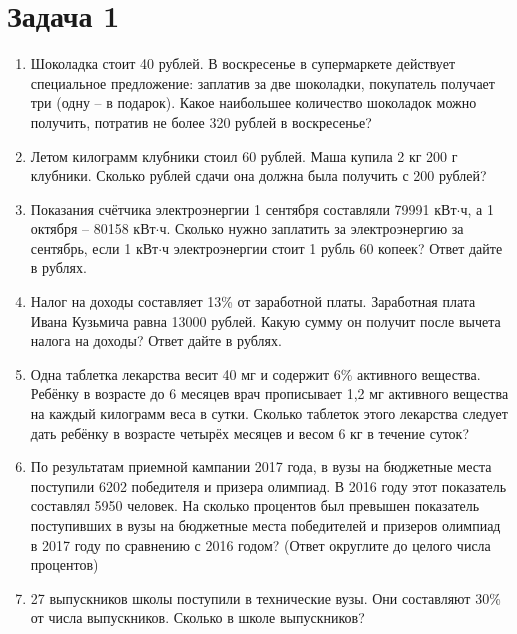 \chapter{Задача 1}	
	\begin{enumerate}
	
	\item  Шоколадка стоит 40 рублей. В воскресенье в супермаркете действует  
	специальное    предложение:  заплатив  за  две  шоколадки, покупатель  получает  три 
	(одну  –  в  подарок). Какое наибольшее  количество  шоколадок  можно  получить, 
	потратив не более 320 рублей в воскресенье? 
	
	\item Летом  килограмм  клубники  стоил  60  рублей. Маша  купила  2  кг  200  г  клубники. 
	Сколько рублей сдачи она должна была получить с 200 рублей?
	
	\item Показания счётчика электроэнергии 1 сентября составляли 79991 кВт$\cdot$ч, а 1 октября 
	–  80158  кВт$\cdot$ч.  Сколько  нужно  заплатить  за  электроэнергию  за  сентябрь, если  1  кВт$\cdot$ч 
	электроэнергии стоит 1 рубль 60 копеек? Ответ дайте в рублях. 
	
	\item Налог  на  доходы  составляет  13\%  от  заработной  платы.  Заработная  плата  Ивана 
	Кузьмича  равна  13000  рублей.  Какую  сумму  он  получит  после  вычета  налога  на 
	доходы? Ответ дайте в рублях. 
	
	\item Одна таблетка лекарства весит 40 мг и содержит 6\% активного вещества. Ребёнку в 
	возрасте  до  6  месяцев  врач  прописывает  1,2  мг  активного  вещества  на  каждый 
	килограмм  веса  в  сутки.  Сколько  таблеток  этого  лекарства  следует  дать  ребёнку  в 
	возрасте четырёх месяцев и весом 6 кг в течение суток? 
	
	\item По  результатам  приемной  кампании  2017  года,  в  вузы  на  бюджетные  места 
	поступили  6202  победителя  и  призера  олимпиад.  В  2016  году  этот  показатель 
	составлял 5950 человек. На сколько процентов был превышен показатель поступивших 
	в  вузы  на  бюджетные  места  победителей  и  призеров  олимпиад  в  2017  году  по 
	сравнению с 2016 годом? (Ответ округлите до целого числа процентов) 

	
	\item 27  выпускников  школы  поступили    в  технические  вузы.  Они  составляют  30\%  от 
	числа выпускников. Сколько в школе выпускников?
	

\end{enumerate}

